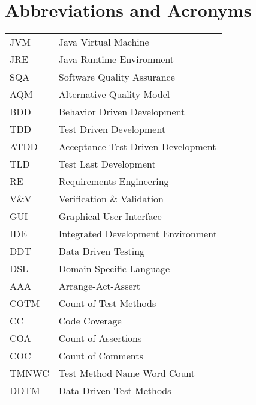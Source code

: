 \chapter*{Abbreviations and Acronyms}


\noindent
\begin{longtable}{@{}p{}p{}@{}}
JVM & Java Virtual Machine \\
JRE & Java Runtime Environment \\
SQA & Software Quality Assurance \\
AQM & Alternative Quality Model \\
BDD & Behavior Driven Development \\
TDD & Test Driven Development \\
ATDD & Acceptance Test Driven Development \\
TLD & Test Last Development \\
RE & Requirements Engineering \\
V\&V & Verification \& Validation \\
GUI & Graphical User Interface \\
IDE & Integrated Development Environment \\
DDT & Data Driven Testing \\
DSL & Domain Specific Language \\
AAA & Arrange-Act-Assert \\
COTM & Count of Test Methods \\
CC & Code Coverage \\
COA & Count of Assertions \\
COC & Count of Comments \\
TMNWC & Test Method Name Word Count \\
DDTM & Data Driven Test Methods \\
\end{longtable}
